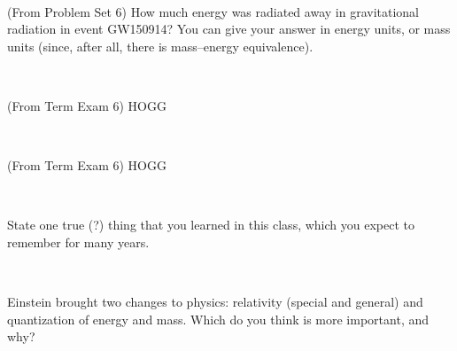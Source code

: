 \documentclass[12pt, letterpaper]{article}
\begin{document}
\vfill ~

\begin{problem}
  (From Problem Set 6)
  How much energy was radiated away in gravitational radiation in event GW150914?
  You can give your answer in energy units, or mass units (since, after all, there
  is mass--energy equivalence).
\end{problem}

\vfill ~

\begin{problem}
  (From Term Exam 6)
  HOGG
\end{problem}

\vfill ~

\begin{problem}
  (From Term Exam 6)
  HOGG
\end{problem}

\vfill ~

\clearpage

\begin{problem}
State one true (?) thing that you learned in this class,
which you expect to remember for many years.
\end{problem}

\vfill ~

\begin{problem}
Einstein brought two changes to physics: relativity (special and general) and
quantization of energy and mass. Which do you think is more important, and why?
\end{problem}

\vfill ~

~

\vfill ~

~

\vfill ~
\end{document}
